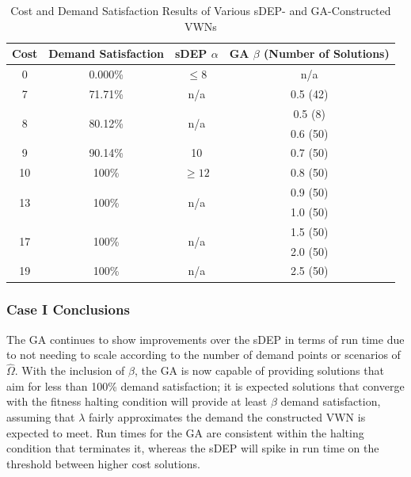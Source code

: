 \documentclass[12pt,dvipsnames]{report}
\begin{document}
\begin{table}[htp]
	\centering
	\caption[Cost and Demand Satisfaction Results of Case I Approaches]{Cost and Demand Satisfaction Results of Various sDEP- and GA-Constructed VWNs}
	\begin{tabular}{|c|c|c|c|} 
		\hline
		\textbf{Cost} & \textbf{Demand Satisfaction} & \textbf{sDEP $\alpha$} & \textbf{GA $\beta$ (Number of Solutions)} \\
		\hline
		0 & 0.000\% & $\leq 8$ & n/a \\
		\hline
		7 & 71.71\% & n/a & 0.5 (42) \\
		\hline
		\multirow{2}{*}{8} & \multirow{2}{*}{80.12\%} & \multirow{2}{*}{n/a} & 0.5 (8)\\
		& & & 0.6 (50) \\
		\hline
		9 & 90.14\% & 10 & 0.7 (50) \\
		\hline
		10 & 100\% & $\geq 12$ & 0.8 (50) \\
		\hline
		\multirow{2}{*}{13} & \multirow{2}{*}{100\%} & \multirow{2}{*}{n/a} & 0.9 (50) \\
		& & & 1.0 (50) \\
		\hline
		\multirow{2}{*}{17} & \multirow{2}{*}{100\%} & \multirow{2}{*}{n/a} & 1.5 (50) \\
		& & & 2.0 (50) \\
		\hline
		19 & 100\% & n/a & 2.5 (50) \\
		\hline
	\end{tabular}
	\label{tab:CaseI_ComparisonCostSat}
\end{table}

\subsubsection{Case I Conclusions}

The GA continues to show improvements over the sDEP in terms of run time due to not needing to scale according to the number of demand points or scenarios of $\hat{\Omega}$.  With the inclusion of $\beta$, the GA is now capable of providing solutions that aim for less than 100\% demand satisfaction; it is expected solutions that converge with the fitness halting condition will provide at least $\beta$ demand satisfaction, assuming that $\lambda$ fairly approximates the demand the constructed VWN is expected to meet.  Run times for the GA are consistent within the halting condition that terminates it, whereas the sDEP will spike in run time on the threshold between higher cost solutions.
\end{document}
